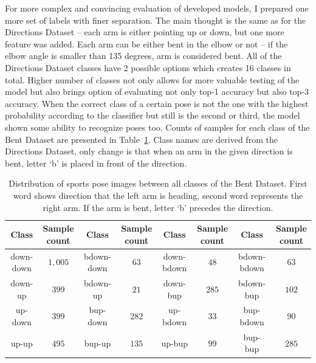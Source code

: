 For more complex and convincing evaluation of developed models, I prepared one more set of labels with finer separation. The main thought is the same as for the Directions Dataset -- each arm is either pointing up or down, but one more feature was added. Each arm can be either bent in the elbow or not -- if the elbow angle is smaller than 135 degrees, arm is considered bent. All of the Directions Dataset classes have 2 possible options which creates 16 classes in total. Higher number of classes not only allows for more valuable testing of the model but also brings option of evaluating not only top-1 accuracy but also top-3 accuracy. When the correct class of a certain pose is not the one with the highest probability according to the classifier but still is the second or third, the model shown some ability to recognize poses too. Counts of samples for each class of the Bent Dataset are presented in Table~\ref{tab:bent-dataset-counts}. Class names are derived from the Directions Dataset, only change is that when an arm in the given direction is bent, letter `b' is placed in front of the direction.

\begin{table}[!ht]
    \footnotesize
    \begin{center}
        \begin{tabular}{ |c|c||c|c||c|c||c|c| }
            \hline
                Class & \makecell{Sample \\ count} & Class & \makecell{Sample \\ count} & Class & \makecell{Sample \\ count} & Class & \makecell{Sample \\ count} \\
            \hline
            \hline
            down-down & $1{,}005$ & bdown-down & $63$ & down-bdown & $48$ & bdown-bdown & $63$ \\
            \hline
            down-up & $399$ & bdown-up & $21$ & down-bup & $285$ & bdown-bup & $102$ \\
            \hline
            up-down & $399$ & bup-down & $282$ & up-bdown & $33$ & bup-bdown & $90$ \\
            \hline
            up-up & $495$ & bup-up & $135$ & up-bup & $99$ & bup-bup & $285$ \\
            \hline
        \end{tabular}
    \end{center}
    \caption{Distribution of sports pose images between all classes of the Bent Dataset. First word shows direction that the left arm is heading, second word represents the right arm. If the arm is bent, letter `b' precedes the direction.}
    \label{tab:bent-dataset-counts}
\end{table}

